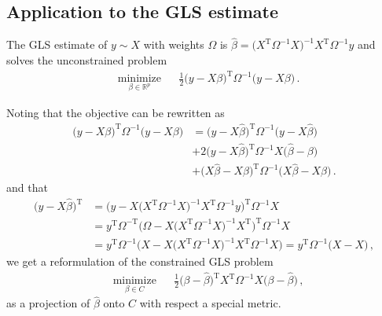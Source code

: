 \documentclass[a4paper]{article}
\newcommand{\real}{\mathbb{R}}
\newcommand{\T}{\mathrm{T}}
\begin{document}

\subsection*{Application to the GLS estimate} %
\label{sub:application_to_the_gls_estimate}

The GLS estimate of $y\sim X$ with weights $\Omega$ is $\hat{\beta} = \bigl(X^\T \Omega^{-1} X
\bigr)^{-1} X^\T \Omega^{-1} y$ and solves the unconstrained problem
\begin{equation} \label{eq:gls_unc}
  \begin{aligned}
    & \underset{\beta\in \real^p}{\text{minimize}}
      & & \tfrac12 \bigl(y - X \beta\bigr)^\T \Omega^{-1} \bigl(y - X \beta\bigr)
          \,.
  \end{aligned}
\end{equation}

Noting that the objective can be rewritten as
\begin{align*}
  \bigl(y - X \beta\bigr)^\T \Omega^{-1} \bigl(y - X \beta\bigr)
    &= \bigl(y - X \hat{\beta}\bigr)^\T \Omega^{-1} \bigl(y - X \hat{\beta}\bigr)
    \\
    &+ 2 \bigl(y - X \hat{\beta}\bigr)^\T \Omega^{-1} X \bigl(\hat{\beta} - \beta\bigr)
    \\
    &+ \bigl(X \hat{\beta} - X \beta\bigr)^\T \Omega^{-1} \bigl(X \hat{\beta} - X \beta\bigr)
    \,.
\end{align*}
and that
\begin{align*}
  \bigl(y - X \hat{\beta}\bigr)^\T
    &= \bigl(y - X \bigl(X^\T \Omega^{-1} X \bigr)^{-1} X^\T \Omega^{-1} y\bigr)^\T \Omega^{-1} X
    \\
    &= y^\T \Omega^{-\T} \bigl(\Omega - X \bigl(X^\T \Omega^{-1} X \bigr)^{-1} X^\T \bigr)^\T \Omega^{-1} X
    \\
    &= y^\T \Omega^{-1} \bigl(X - X \bigl(X^\T \Omega^{-1} X \bigr)^{-1} X^\T \Omega^{-1} X \bigr)
    = y^\T \Omega^{-1} \bigl(X - X\bigr)
    \,,
\end{align*}
we get a reformulation of the constrained GLS problem
\begin{equation} \label{eq:gls_proj}
  \begin{aligned}
    & \underset{\beta\in C}{\text{minimize}}
      & & \tfrac12 \bigl(\beta - \hat{\beta} \bigr)^\T X^\T \Omega^{-1} X \bigl(\beta - \hat{\beta}\bigr)
          \,,
  \end{aligned}
\end{equation}
as a projection of $\hat{\beta}$ onto $C$ with respect a special metric.

\end{document}
